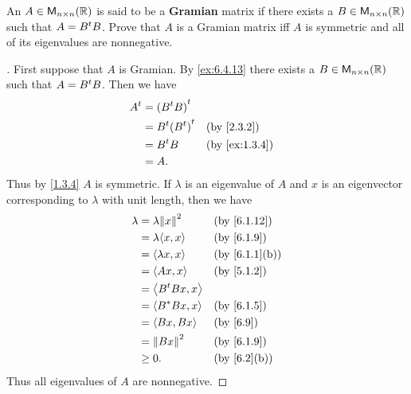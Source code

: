 \begin{ex}\label{ex:6.4.13}
	An \(A \in \ms[n][n][\R]\) is said to be a \textbf{Gramian} matrix if there exists a \(B \in \ms[n][n][\R]\) such that \(A = {B}^{t} B\).
	Prove that \(A\) is a Gramian matrix iff \(A\) is symmetric and all of its eigenvalues are nonnegative.
\end{ex}

\begin{proof}[]
	First suppose that \(A\) is Gramian.
	By \cref{ex:6.4.13} there exists a \(B \in \ms[n][n][\R]\) such that \(A = {B}^{t} B\).
	Then we have
	\begin{align*}
		\tp{A} & = \tp{(\tp{B} B)}                         \\
		       & = \tp{B} \tp{(\tp{B})} &  & \by{2.3.2}    \\
		       & = \tp{B} B             &  & \by{ex:1.3.4} \\
		       & = A.
	\end{align*}
	Thus by \cref{1.3.4} \(A\) is symmetric.
	If \(\lambda\) is an eigenvalue of \(A\) and \(x\) is an eigenvector corresponding to \(\lambda\) with unit length, then we have
	\begin{align*}
		\lambda & = \lambda \norm{x}^2  &  & \by{6.1.12}   \\
		        & = \lambda \inn{x, x}  &  & \by{6.1.9}    \\
		        & = \inn{\lambda x, x}  &  & \by{6.1.1}[b] \\
		        & = \inn{Ax, x}         &  & \by{5.1.2}    \\
		        & = \inn{\tp{B} B x, x}                    \\
		        & = \inn{B^* B x, x}    &  & \by{6.1.5}    \\
		        & = \inn{Bx, Bx}        &  & \by{6.9}      \\
		        & = \norm{Bx}^2         &  & \by{6.1.9}    \\
		        & \geq 0.               &  & \by{6.2}[b]
	\end{align*}
	Thus all eigenvalues of \(A\) are nonnegative.


\end{proof}
